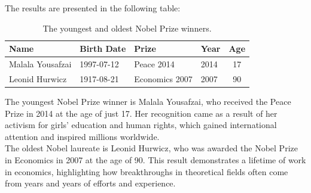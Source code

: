 \documentclass{article}
\begin{document}
The results are presented in the following table:

\begin{table}[h!]
\centering
\caption{The youngest and oldest Nobel Prize winners.}
\begin{tabular}{|l|l|l|l|c|}
\hline
\textbf{Name}    & \textbf{Birth Date} & \textbf{Prize}      & \textbf{Year} & \textbf{Age} \\ \hline
Malala Yousafzai & 1997-07-12          & Peace 2014          & 2014          & 17           \\ \hline
Leonid Hurwicz   & 1917-08-21          & Economics 2007      & 2007          & 90           \\ \hline
\end{tabular}
\label{tab:youngest_oldest}
\end{table}

The youngest Nobel Prize winner is Malala Yousafzai, who received the Peace Prize in 2014 at the age of just 17.
Her recognition came as a result of her activism for girls' education and human rights, which gained international
attention and inspired millions worldwide.\\
The oldest Nobel laureate is Leonid Hurwicz, who was awarded the Nobel Prize in Economics in 2007 at the age of 90.
This result demonstrates a lifetime of work in economics, highlighting how breakthroughs in theoretical fields
often come from years and years of efforts and experience.
\end{document}
